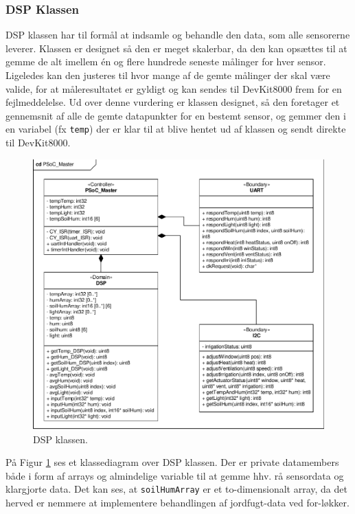 \subsubsection{DSP Klassen}

DSP klassen har til formål at indsamle og behandle den data, som alle sensorerne leverer. Klassen er designet så den er meget skalerbar, da den kan opsættes til at gemme de alt imellem én og flere hundrede seneste målinger for hver sensor. Ligeledes kan den justeres til hvor mange af de gemte målinger der skal være valide, for at måleresultatet er gyldigt og kan sendes til DevKit8000 frem for en fejlmeddelelse. Ud over denne vurdering er klassen designet, så den foretager et gennemsnit af alle de gemte datapunkter for en bestemt sensor, og gemmer den i en variabel (fx \texttt{temp}) der er klar til at blive hentet ud af klassen og sendt direkte til DevKit8000.

\begin{figure}[ht]
\centering 
\includegraphics[width=\textwidth * 2/5, trim=15 13 268 182, clip=true] {../fig/cd_PSoC_master.pdf}
\caption{DSP klassen.}
\label{fig:DSP_klasse}
\end{figure}

På Figur \ref{fig:DSP_klasse} ses et klassediagram over DSP klassen. Der er private datamembers både i form af arrays og almindelige variable til at gemme hhv. rå sensordata og klargjorte data. Det kan ses, at \texttt{soilHumArray} er et to-dimensionalt array, da det herved er nemmere at implementere behandlingen af jordfugt-data ved for-løkker.

